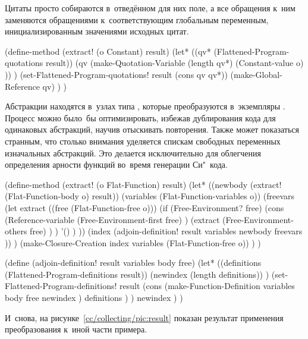 Цитаты просто собираются в~отведённом для них поле, а все обращения к~ним
заменяются обращениями к~соответствующим глобальным переменным,
инициализированным значениями исходных цитат.

\begin{code:lisp}
(define-method (extract! (o Constant) result)
  (let* ((qv* (Flattened-Program-quotations result))
         (qv  (make-Quotation-Variable (length qv*)
                                       (Constant-value o) )) )
    (set-Flattened-Program-quotations! result (cons qv qv*))
    (make-Global-Reference qv) ) )
\end{code:lisp}

Абстракции находятся в~узлах типа , которые преобразуются
в~экземпляры . Процесс можно было~бы оптимизировать,
избежав дублирования кода для одинаковых абстракций, научив
 отыскивать повторения. Также может показаться странным,
что столько внимания уделяется спискам свободных переменных изначальных
абстракций. Это делается исключительно для облегчения определения арности
функций во~время генерации Си"~кода.

\begin{code:lisp}
(define-method (extract! (o Flat-Function) result)
  (let* ((newbody   (extract! (Flat-Function-body o) result))
         (variables (Flat-Function-variables o))
         (freevars  (let extract ((free (Flat-Function-free o)))
                      (if (Free-Environment? free)
                          (cons (Reference-variable
                                 (Free-Environment-first free) )
                                (extract
                                 (Free-Environment-others free) ) )
                          '() ) ))
         (index (adjoin-definition!
                 result variables newbody freevars )) )
    (make-Closure-Creation index variables (Flat-Function-free o)) ) )

(define (adjoin-definition! result variables body free)
  (let* ((definitions (Flattened-Program-definitions result))
         (newindex (length definitions)) )
    (set-Flattened-Program-definitions!
     result (cons (make-Function-Definition
                   variables body free newindex )
                  definitions ) )
    newindex ) )
\end{code:lisp}

И~снова, на рисунке~\ref{cc/collecting/pic:result} показан результат применения
преобразования к~иной части примера.

